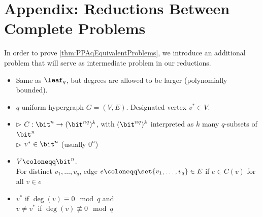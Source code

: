 \appendix
\setcounter{section}{0}
\setcounter{theorem}{46}
\section{Appendix: Reductions Between Complete Problems}
\label{sec:equivalences}

In order to prove \autoref{thm:PPAqEquivalentProblems}, we introduce an additional problem that will serve as intermediate problem in our reductions.\\[1mm]


\noindent
\begin{minipage}{\linewidth}
\begin{definition}
	\label{def:leaf-prime} \vspace{-5pt}
	\begin{itemize}[leftmargin=2.15cm,itemsep=4pt]
		\item[\slshape Principle:] Same as $\leaf_q$, but degrees are allowed to be larger (polynomially bounded).
		\item[\slshape Object:] $q$-uniform hypergraph $G = (V, E)$. Designated vertex $v^* \in V$.
		\item[\slshape Inputs:] $\triangleright$ $C:\bit^n \to (\bit^{nq})^k$, with $(\bit^{nq})^k$ interpreted as $k$ many $q$-subsets of $\bit^n$\\
	$\triangleright$ $v^* \in \bit^n$ (usually $0^n$)
		\item[\slshape Encoding:] $V\coloneqq\bit^n$.\\
	For distinct $v_1, \ldots, v_q$, edge $e\coloneqq\set{v_1, \ldots, v_q}\in E$ if $e \in C(v)$ for all $v \in e$
		\item[\slshape Solutions:] $v^*$ if $\deg(v) \equiv 0 \mod{q}$ and\\
	$v \ne v^*$ if $\deg(v) \not\equiv 0 \mod{q}$
	\end{itemize}
\end{definition}
\end{minipage}\vspace{5mm}


